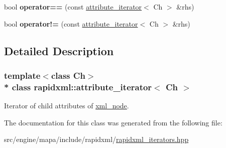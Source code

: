 \begin{DoxyCompactItemize}
\item 
bool {\bfseries operator==} (const \hyperlink{classrapidxml_1_1attribute__iterator}{attribute\+\_\+iterator}$<$ Ch $>$ \&rhs)\hypertarget{classrapidxml_1_1attribute__iterator_ab1dc8dd11d21e145a4e3f76d46aead0d}{}\label{classrapidxml_1_1attribute__iterator_ab1dc8dd11d21e145a4e3f76d46aead0d}

\item 
bool {\bfseries operator!=} (const \hyperlink{classrapidxml_1_1attribute__iterator}{attribute\+\_\+iterator}$<$ Ch $>$ \&rhs)\hypertarget{classrapidxml_1_1attribute__iterator_a39e8cf336c324521fd9c720abf280d88}{}\label{classrapidxml_1_1attribute__iterator_a39e8cf336c324521fd9c720abf280d88}

\end{DoxyCompactItemize}


\subsection{Detailed Description}
\subsubsection*{template$<$class Ch$>$\\*
class rapidxml\+::attribute\+\_\+iterator$<$ Ch $>$}

Iterator of child attributes of \hyperlink{classrapidxml_1_1xml__node}{xml\+\_\+node}. 

The documentation for this class was generated from the following file\+:\begin{DoxyCompactItemize}
\item 
src/engine/mapa/include/rapidxml/\hyperlink{rapidxml__iterators_8hpp}{rapidxml\+\_\+iterators.\+hpp}\end{DoxyCompactItemize}
